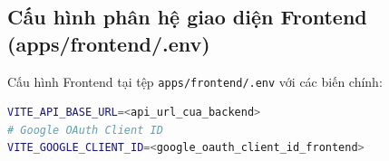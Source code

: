 \documentclass[../DoAn.tex]{subfiles}
\begin{document}
\subsection{Cấu hình phân hệ giao diện Frontend (apps/frontend/.env)}
Cấu hình Frontend tại tệp \texttt{apps/frontend/.env} với các biến chính:
\begin{lstlisting}[language=bash]
VITE_API_BASE_URL=<api_url_cua_backend>
# Google OAuth Client ID
VITE_GOOGLE_CLIENT_ID=<google_oauth_client_id_frontend>
\end{lstlisting}
\end{document}
